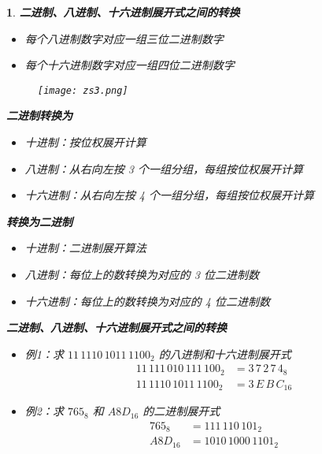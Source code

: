 \documentclass[UTF8]{report}
\theoremstyle{MyLineTheoremStyle} %
\theoremstyle{MyBlockTheoremStyle} %
\theoremstyle{MySubsubsectionStyle} %
\newtheorem{definition}{}
\begin{document}
\begin{definition}
    \textbf{二进制、八进制、十六进制展开式之间的转换}
    \begin{itemize}
        \item 每个八进制数字对应一组三位二进制数字
        \item 每个十六进制数字对应一组四位二进制数字
    \end{itemize}

    \begin{figure}[ht]
        \centering
        \texttt{[image: zs3.png]}
    \end{figure}

    \textbf{二进制转换为}
    \begin{itemize}
        \item 十进制：按位权展开计算
        \item 八进制：从右向左按 3 个一组分组，每组按位权展开计算
        \item 十六进制：从右向左按 4 个一组分组，每组按位权展开计算
    \end{itemize}

    \textbf{转换为二进制}
    \begin{itemize}
        \item 十进制：二进制展开算法
        \item 八进制：每位上的数转换为对应的 3 位二进制数
        \item 十六进制：每位上的数转换为对应的 4 位二进制数
    \end{itemize}

    \textbf{二进制、八进制、十六进制展开式之间的转换}
    \begin{itemize}
        \item 例1：求 $11\,1110\,1011\,1100_2$ 的八进制和十六进制展开式
        \begin{align*}
        11\,111\,010\,111\,100_2 &= 3\,7\,2\,7\,4_8 \\
        11\,1110\,1011\,1100_2 &= 3\,E\,B\,C_{16}
        \end{align*}
        \item 例2：求 $765_8$ 和 $A8D_{16}$ 的二进制展开式
        \begin{align*}
        765_8 &= 111\,110\,101_2 \\
        A8D_{16} &= 1010\,1000\,1101_2
        \end{align*}
    \end{itemize}


\end{definition}
\end{document}
